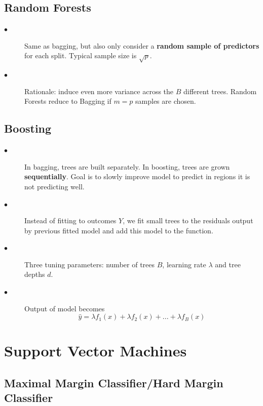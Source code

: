 \documentclass{article}
\begin{document}
\subsection{Random Forests}

\begin{description}

      \item[$\bullet$] Same as bagging, but also only consider a \textbf{random sample of predictors} for each split. Typical sample size is $\sqrt{p}$.
      
      \item[$\bullet$] Rationale: induce even more variance across the $B$ different trees. Random Forests reduce to Bagging if $m=p$ samples are chosen.
\end{description}

\subsection{Boosting}

\begin{description}

      \item[$\bullet$] In bagging, trees are built separately. In boosting, trees are grown \textbf{sequentially}. Goal is to slowly improve model to predict in regions it is not predicting well.
      
      \item[$\bullet$] Instead of fitting to outcomes $Y$, we fit small trees to the residuals output by previous fitted model and add this model to the function.
      
    \item[$\bullet$] Three tuning parameters: number of trees $B$, learning rate $\lambda$ and tree depths $d$.
    
    \item[$\bullet$] Output of model becomes
    \[\hat{y} = \lambda f_1(x) + \lambda f_2(x) + ... + \lambda f_B(x)\]
    
    

\end{description}

\newpage

\section{Support Vector Machines}

\subsection{Maximal Margin Classifier/Hard Margin Classifier}
\end{document}
